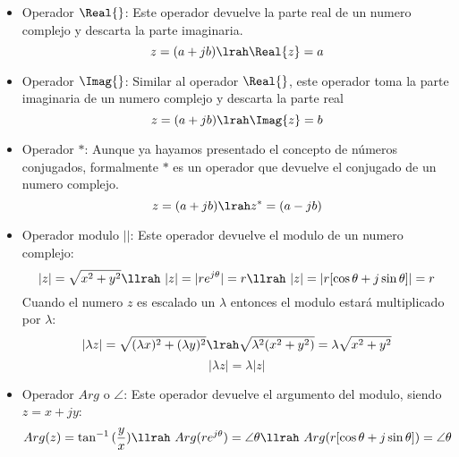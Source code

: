 \begin{itemize}
    \item Operador $\Real{}$:
    Este operador devuelve la parte real de un numero complejo y descarta la parte imaginaria.
    \begin{equation}\label{eq:DefImagC}
        z=(a+jb) \lrah \Real{z}=a
    \end{equation}
     \item Operador $\Imag{}$: 
     Similar al operador $\Real{}$, este operador toma la parte imaginaria de un numero complejo y descarta la parte real
     \begin{equation}\label{eq:DefRealC}
         z=(a+jb) \lrah \Imag{z}=b
     \end{equation}
     \item Operador $*$:
      Aunque ya hayamos presentado el concepto de números conjugados, formalmente $*$ es un operador que devuelve el conjugado de un numero complejo.
      \begin{equation}\label{eq:DefConC}
          z=(a+jb) \lrah z^*=(a-jb)
      \end{equation}
      \item Operador modulo $||$:
      Este operador devuelve el modulo de un numero complejo:
      \begin{equation}\label{eq:DefModC}
          |z|=\sqrt{x^2+y^2} \llrah\ |z|=|re^{j\theta}|=r \llrah\ |z|=|r[\cos{\theta}+j\sin{\theta}]|=r
      \end{equation}
      Cuando el numero $z$ es escalado un $\lambda$ entonces el modulo estará multiplicado por $\lambda$:
      \begin{equation}
          |\lambda z|=\sqrt{(\lambda x)^2+(\lambda y)^2}\lrah\sqrt{\lambda^2(x^2+y^2)}=\lambda\sqrt{x^2+y^2}
      \end{equation}
      \begin{equation}
          |\lambda z|=\lambda|z|
      \end{equation}
      \item Operador $Arg$ o $\angle$:
      Este operador devuelve el argumento del modulo, siendo $z=x+jy$:
      \begin{equation}
          Arg(z)=\tan^{-1}{(\frac{y}{x})} \llrah\ Arg(re^{j\theta})=\angle\theta \llrah\ Arg(r[\cos{\theta}+j\sin{\theta}])=\angle\theta
      \end{equation}
      
     
\end{itemize}
